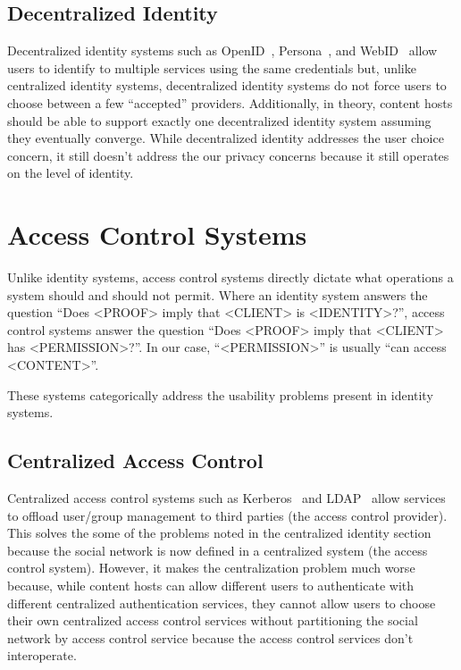 \documentclass[pdftex,12pt,a4papaer]{report}
\begin{document}
\subsection{Decentralized Identity}

Decentralized identity systems such as OpenID~\cite{openid},
Persona~\cite{persona}, and WebID~\cite{webid} allow users to identify to
multiple services using the same credentials but, unlike centralized identity
systems, decentralized identity systems do not force users to choose
between a few ``accepted'' providers. Additionally, in theory, content hosts
should be able to support exactly one decentralized identity system assuming
they eventually converge. While decentralized identity addresses the user choice
concern, it still doesn't address the our privacy concerns because it still
operates on the level of identity.

\section{Access Control Systems}

Unlike identity systems, access control systems directly dictate what operations
a system should and should not permit. Where an identity system answers the
question ``Does <PROOF> imply that <CLIENT> is <IDENTITY>?'', access control systems
answer the question ``Does <PROOF> imply that <CLIENT> has <PERMISSION>?''. In our
case, ``<PERMISSION>'' is usually ``can access <CONTENT>''.

These systems categorically address the usability problems present in identity
systems.

\subsection{Centralized Access Control}

Centralized access control systems such as Kerberos~\cite{kerberos} and
LDAP~\cite{ldap} allow services to offload user/group management to third
parties (the access control provider). This solves the some of the  problems noted
in the centralized identity section because the social network is now defined in
a centralized system (the access control system). However, it makes the
centralization problem much worse because, while content hosts can allow
different users to authenticate with different centralized authentication
services, they cannot allow users to choose their own centralized access control
services without partitioning the social network by access control service
because the access control services don't interoperate.
\end{document}
